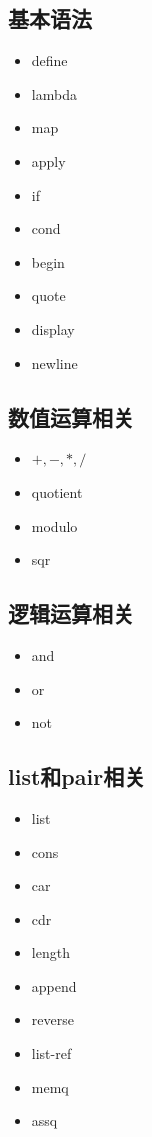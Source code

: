 \documentclass[11pt, a4paper]{article}
\begin{document}
		\subsection{基本语法}
			\begin{itemize}
				\item define
				\item lambda
				\item map
				\item apply
				\item if
				\item cond
				\item begin
				\item quote
				\item display
				\item newline
			\end{itemize}
		\subsection{数值运算相关}
			\begin{itemize}
				\item $+,-,*,/$
				\item quotient
				\item modulo
				\item sqr
			\end{itemize}
		\subsection{逻辑运算相关}
			\begin{itemize}
				\item and
				\item or
				\item not
			\end{itemize}
		\subsection{list和pair相关}
			\begin{itemize}
				\item list
				\item cons
				\item car
				\item cdr
				\item length
				\item append
				\item reverse
				\item list-ref
				\item memq
				\item assq
			\end{itemize}
\end{document}
